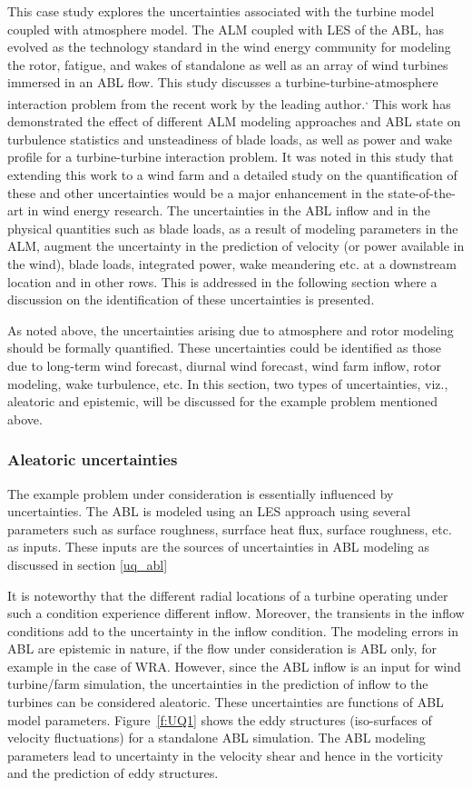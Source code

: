 \documentclass[]{aiaa-tc}%
\begin{document}
This case study explores the uncertainties associated with the turbine model coupled with atmosphere model. 
The ALM coupled with LES of the ABL, has evolved as the technology standard in the wind energy community for modeling the rotor, fatigue, and wakes of standalone as well as an array of wind turbines immersed in an ABL flow. This study discusses a turbine-turbine-atmosphere interaction problem from the recent work by the leading author.\cite{jha:aiaa2014}\textsuperscript{, }\cite{jha:jsee2014} This work has demonstrated the effect of different ALM modeling approaches and ABL state on turbulence statistics and unsteadiness of blade loads, as well as power and wake profile for a turbine-turbine interaction problem. It was noted in this study that extending this work to a wind farm and a detailed study on the quantification of these and other uncertainties would be a major enhancement in the state-of-the-art in wind energy research. The uncertainties in the ABL inflow and in the physical quantities such as blade loads, as a result of modeling parameters in the ALM, augment the uncertainty in the prediction of velocity (or power available in the wind), blade loads, integrated power, wake meandering etc. at a downstream location and in other rows. This is addressed in the following section where a discussion on the identification of these uncertainties is presented.

As noted above, the uncertainties arising due to atmosphere and rotor modeling should be formally quantified. These uncertainties could be identified as those due to long-term wind forecast, diurnal wind forecast, wind farm inflow, rotor modeling, wake turbulence, etc. In this section, two types of uncertainties, viz., aleatoric and epistemic, will be discussed for the example problem mentioned above. 

\subsubsection{Aleatoric uncertainties}

The example problem under consideration is essentially influenced by uncertainties. The ABL is modeled using an LES approach\cite{churchfield:aiaa2012} using several parameters such as surface roughness, surrface heat flux, surface roughness, etc. as inputs. These inputs are the sources of uncertainties in ABL modeling as discussed in section \ref{uq_abl}

It is noteworthy that the different radial locations of a turbine operating under such a condition experience different inflow. Moreover, the transients in the inflow conditions add to the uncertainty in the inflow condition. The modeling errors in ABL are epistemic in nature, if the flow under consideration is ABL only, for example in the case of WRA. However, since the ABL inflow is an input for wind turbine/farm simulation, the uncertainties in the prediction of inflow to the turbines can be considered aleatoric. These uncertainties are functions of ABL model parameters. Figure~\ref{f:UQ1} shows the eddy structures (iso-surfaces of velocity fluctuations) for a standalone ABL simulation. The ABL modeling parameters lead to uncertainty in the velocity shear and hence in the vorticity and the prediction of eddy structures.
\end{document}
